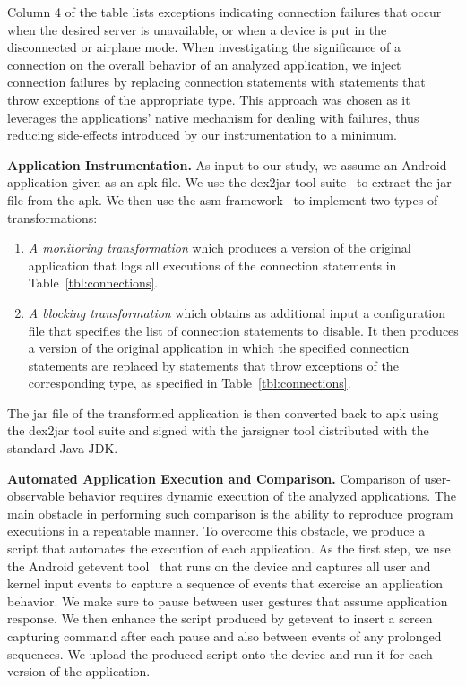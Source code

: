 Column 4 of the table lists exceptions indicating connection failures that occur when the desired server is unavailable, or when a device is put in the disconnected or airplane mode. 
When investigating the significance of a connection on the overall behavior of an analyzed application, we inject connection failures by replacing connection statements with statements that throw exceptions of the appropriate type. 
This approach was chosen as it leverages the applications' native mechanism for dealing with failures, thus reducing side-effects introduced by our instrumentation to a minimum.

\vspace{0.1in}
\noindent 
{\bf Application Instrumentation.}
As input to our study, we assume an Android application given as an apk file. 
We use the dex2jar tool suite~\cite{dex2jar} to extract the jar file from the apk.
We then use the asm framework~\cite{asm} to implement two types of transformations: 
\begin{enumerate}
\item \emph{A monitoring transformation} which produces a version of the original application that logs all executions of the connection statements in Table~\ref{tbl:connections}. 
\item \emph{A blocking transformation} which obtains as additional input a configuration file that specifies the list of connection statements to disable. It then produces a version of the original application in which the specified connection statements are replaced by statements that throw exceptions of the corresponding type, as specified in Table~\ref{tbl:connections}.
\end{enumerate}
The jar file of the transformed application is then converted back to apk using the dex2jar tool suite and signed with the jarsigner tool distributed with the standard Java JDK.
 

\vspace{0.1in}
\noindent 
{\bf Automated Application Execution and Comparison.}
Comparison of user-observable behavior requires dynamic execution of the analyzed applications. 
The main obstacle in performing such comparison is the ability to reproduce program executions in a repeatable manner. 
To overcome this obstacle, we produce a script that automates the execution of each application.
As the first step, we use the Android getevent tool~\cite{getevent} that runs on the device and captures all user and kernel input events to capture a sequence of events that exercise an application behavior. We make sure to pause between user gestures that assume application response. 
We then enhance the script produced by getevent to insert a screen capturing command after each pause and also between events of any prolonged sequences. 
We upload the produced script onto the device and run it for each version of the application. 

